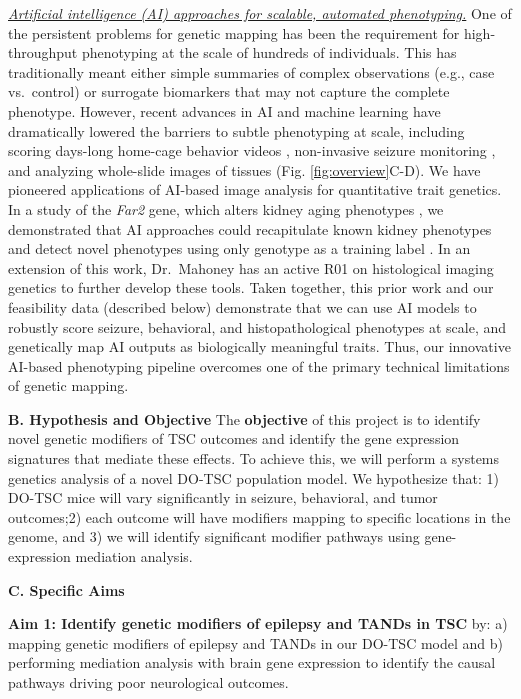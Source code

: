 \documentclass[
  12pt,
]{article}
\begin{document}
\textit{\underline{Artificial intelligence (AI) approaches for scalable, automated phenotyping.}}
One of the persistent problems for genetic mapping has been the
requirement for high-throughput phenotyping at the scale of hundreds of
individuals. This has traditionally meant either simple summaries of
complex observations (e.g., case vs.~control) or surrogate biomarkers
that may not capture the complete phenotype. However, recent advances in
AI and machine learning have dramatically lowered the barriers to subtle
phenotyping at scale, including scoring days-long home-cage behavior
videos
\cite{30127430, 26687221, 30573820, 31570119, 29779950, 37091193, 34718812, 35021077, 33729153},
non-invasive seizure monitoring \cite{36841241}, and analyzing
whole-slide images of tissues \cite{35202643, 31308507} (Fig.
\ref{fig:overview}C-D). We have pioneered applications of AI-based image
analysis for quantitative trait genetics. In a study of the
\textit{Far2} gene, which alters kidney aging phenotypes
\cite{29652635}, we demonstrated that AI approaches could recapitulate
known kidney phenotypes and detect novel phenotypes using only genotype
as a training label \cite{31220455}. In an extension of this work,
Dr.~Mahoney has an active R01 on histological imaging genetics to
further develop these tools. Taken together, this prior work and our
feasibility data (described below) demonstrate that we can use AI models
to robustly score seizure, behavioral, and histopathological phenotypes
at scale, and genetically map AI outputs as biologically meaningful
traits. Thus, our innovative AI-based phenotyping pipeline overcomes one
of the primary technical limitations of genetic mapping.

\textbf{B. Hypothesis and Objective} The \textbf{objective} of this
project is to identify novel genetic modifiers of TSC outcomes and
identify the gene expression signatures that mediate these effects. To
achieve this, we will perform a systems genetics analysis of a novel
DO-TSC population model. We hypothesize that: 1) DO-TSC mice will vary
significantly in seizure, behavioral, and tumor outcomes;2) each outcome
will have modifiers mapping to specific locations in the genome, and 3)
we will identify significant modifier pathways using gene-expression
mediation analysis.

\textbf{C. Specific Aims}

\textbf{Aim 1: Identify genetic modifiers of epilepsy and TANDs in TSC}
by: a) mapping genetic modifiers of epilepsy and TANDs in our DO-TSC
model and b) performing mediation analysis with brain gene expression to
identify the causal pathways driving poor neurological outcomes.
\end{document}

